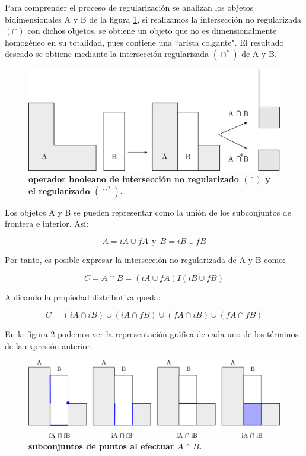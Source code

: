 Para comprender el proceso de regularización se analizan los objetos bidimensionales A y B de la figura \ref{fig:booleano2}, si realizamos la intersección no regularizada $(\cap)$ con dichos objetos, se obtiene un objeto que no es dimensionalmente homogéneo en su totalidad, pues contiene una ``arista colgante". El resultado deseado se obtiene mediante la intersección regularizada $(\cap^*)$ de A y B.


\begin{figure}[h]
\includegraphics[width=12cm]{Img/GEO/geo-booleano3.jpg}
\centering
\caption{\textbf{ \footnotesize{operador booleano de intersección no regularizado $(\cap)$ y el regularizado $(\cap^*)$.}}}
\label{fig:booleano2}
\end{figure}




Los objetos A y B se pueden representar como la unión de los subconjuntos de frontera e interior. Así:

\begin{equation}
   A = iA \cup fA \ \ \text{y} \ \ B = iB \cup fB
\end{equation}

Por tanto, es posible expresar la intersección no regularizada de A y B como:

\begin{equation}
C = A \cap B = (iA \cup fA) I (iB \cup fB)
\end{equation}

Aplicando la propiedad distributiva queda:

\begin{equation}
\label{eq:booleano0}
C = (iA \cap iB) \cup (iA \cap fB) \cup (fA \cap iB) \cup (fA \cap fB)
\end{equation}

En la figura \ref{fig:booleano3} podemos ver la representación gráfica de cada uno de los términos de la expresión anterior.

\begin{figure}[h]
\includegraphics[width=14cm]{Img/GEO/geo-booleano4.png}
\centering
\caption{\textbf{\footnotesize{subconjuntos de puntos al efectuar $A \cap B$.}}}
\label{fig:booleano3}
\end{figure}

